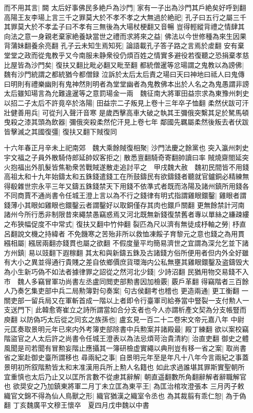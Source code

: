 而不用其言|{
	闕}
太后好事佛民多絶戶為沙門|{
	家有一子出為沙門其戶絶矣好呼到翻}
高陽王友李瑒上言三千之罪莫大於不孝不孝之大無過於絶祀|{
	孔子曰五行之屬三千其罪莫大於不孝孟子曰不孝有三無後為大瑒杖梗翻又音暢}
豈得輕縱背禮之情肆其向法之意一身親老棄家絶養缺當世之禮而求將來之益|{
	佛法以今世修種為來生因果背蒲妹翻養余亮翻}
孔子云未知生焉知死|{
	論語載孔子答子路之言焉於䖍翻}
安有棄堂堂之政而從鬼教乎又今南服未静衆役仍煩百姓之情實多避役若復聽之恐捐棄孝慈比屋皆為沙門矣|{
	復扶又翻比毗必翻又毗至翻}
都統僧暹等忿瑒謂之鬼教以為謗佛|{
	魏有沙門統謂之都統猶今都僧録}
泣訴於太后太后責之瑒曰天曰神地曰祗人曰鬼傳曰明則有禮樂幽則有鬼神然則明者為堂堂幽者為鬼教佛本出於人名之為鬼愚謂非謗太后雖知瑒言為允難違暹等之意罰瑒金一兩　魏征南大將軍田益宗求為東豫州刺史以招二子太后不許竟卒於洛陽|{
	田益宗二子叛見上卷十三年卒子恤翻}
柔然伏跋可汗壯健善用兵|{
	可從刋入聲汗音寒}
是歲西擊高車大破之執其王彌俄突繫其足於駑馬頓曳殺之漆其頭為飲器|{
	彌俄突殺柔然佗汗見上卷七年}
鄰國先羈屬柔然後叛去者伏跋皆擊滅之其國復彊|{
	復扶又翻下賊復同}


十六年春正月辛未上祀南郊　魏大乘餘賊復相聚|{
	沙門法慶之餘黨也}
突入瀛州刺史宇文福之子員外散騎侍郎延帥奴客拒之|{
	散悉亶翻騎奇寄翻帥讀曰率}
賊燒齋閤延突火抱福出外肌髮皆焦勒衆苦戰賊遂散走追討平之　甲戌魏大赦　魏初民間皆不用錢高祖太和十九年始鑄太和五銖錢遣錢工在所鼓鑄民有欲鑄錢者聽就官鑪銅必精練無得殽雜世宗永平三年又鑄五銖錢禁天下用錢不依準式者既而洛陽及諸州鎮所用錢各不同商賈不通尚書令任城王澄上言以為不行之錢律有明式指謂雞眼鐶鑿|{
	雞眼者謂錢薄小其眼如雞眼也鐶鑿云者謂鑿好以取銅僅存其肉也鐶戶關翻}
更無餘禁計河南諸州今所行悉非制限昔來繩禁愚竊惑焉又河北既無新錢復禁舊者專以單絲之縑疎縷之布狹幅促度不中常式|{
	復扶又翻中竹仲翻}
裂匹為尺以濟有無徒成杼軸之勞|{
	杼直呂翻說文機之持緯者}
不免饑寒之苦殆非所以救恤凍餒子育黎元之意也錢之為用貫繦相屬|{
	繦居兩翻亦錢貫也屬之欲翻}
不假度量平均簡易濟世之宜謂為深允乞並下諸方州鎮|{
	易以豉翻下遐稼翻}
其太和與新鑄五銖及古諸錢方俗所便用者但内外全好雖有大小之異並得通行貴賤之差自依鄉價庶貨環海内公私無壅其雞眼鐶鑿及盗鑄毁大為小生新巧偽不如法者據律罪之詔從之然河北少錢|{
	少詩沼翻}
民猶用物交易錢不入市　魏人多竊冒軍功尚書左丞盧同閲吏部勲書因加檢覈|{
	覈戶革翻}
得竊階者三百餘人乃奏乞集吏部中兵二局勲簿對句奏案|{
	句古侯翻考也稽也}
更造兩通|{
	更工衡翻}
一關吏部一留兵局又在軍斬首成一階以上者即令行臺軍司給券當中豎裂一支付勲人一支送門下|{
	此韓愈寄崔立之詩所謂當如合分支者也今人亦謂析產文契為分支帳豎而庾翻}
以防偽巧太后從之同玄之族孫也|{
	盧玄見一百二十二卷宋文帝元嘉八年}
中尉元匡奏取景明元年已來内外考簿吏部除書中兵勲案并諸殿最|{
	殿丁練翻}
欲以案校竊階盜官之人太后許之尚書令任城王澄表以為法忌煩苛治貴清約|{
	治直吏翻}
御史之體風聞是司若聞有冒勲妄階止應攝其一簿研檢虚實繩以典刑豈有移一省之案|{
	取尚書省之案赴御史臺所謂移也}
尋兩紀之事|{
	自景明元年至是年凡十八年今言兩紀之事蓋景明初所叙階勲皆太和末准漢用兵所上勲人名籍也}
如此求過誰堪其罪斯實聖朝所宜重慎也太后乃止又以匡所言數不從慮其辭解|{
	朝直遥翻數所角翻辭解者辭職解官也}
欲奨安之乃加鎮東將軍二月丁未立匡為東平王|{
	為匡治棺攻澄張本}
三月丙子敕織官文錦不得為仙人鳥獸之形|{
	織官猶漢之織室令丞也}
為其裁翦有乖仁恕|{
	為于偽翻}
丁亥魏廣平文穆王懷卒　夏四月戊申魏以中書

